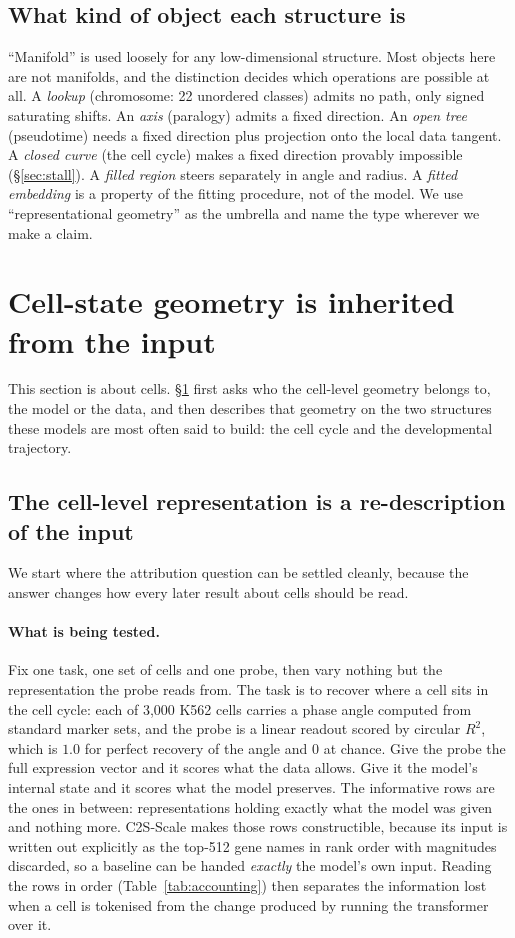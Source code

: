 \documentclass[11pt]{article}
\begin{document}
\subsection{What kind of object each structure is}
``Manifold'' is used loosely for any low-dimensional structure. Most objects here are not manifolds,
and the distinction decides which operations are possible at all. A \emph{lookup}
(chromosome: 22 unordered classes) admits no path, only signed saturating shifts. An \emph{axis}
(paralogy) admits a fixed direction. An \emph{open tree} (pseudotime) needs a fixed direction plus
projection onto the local data tangent. A \emph{closed curve} (the cell cycle) makes a fixed direction
provably impossible (\S\ref{sec:stall}). A \emph{filled region} steers separately in angle and radius.
A \emph{fitted embedding} is a property of the fitting procedure, not of the model. We use
``representational geometry'' as the umbrella and name the type wherever we make a claim.

\section{Cell-state geometry is inherited from the input}\label{sec:inherit}

This section is about cells. \S\ref{sec:inherit} first asks who the cell-level geometry belongs to, the
model or the data, and then describes that geometry on the two structures these models are most often
said to build: the cell cycle and the developmental trajectory.

\subsection{The cell-level representation is a re-description of the input}
We start where the attribution question can be settled cleanly, because the answer changes how every
later result about cells should be read.

\paragraph{What is being tested.} Fix one task, one set of cells and one probe, then vary nothing but
the representation the probe reads from. The task is to recover where a cell sits in the cell cycle:
each of 3{,}000 K562 cells carries a phase angle computed from standard marker sets, and the probe is
a linear readout scored by circular $R^2$, which is $1.0$ for perfect recovery of the angle and $0$ at
chance. Give the probe the full expression vector and it scores what the data allows. Give it the
model's internal state and it scores what the model preserves. The informative rows are the ones in
between: representations holding exactly what the model was given and nothing more. C2S-Scale makes
those rows constructible, because its input is written out explicitly as the top-512 gene names in
rank order with magnitudes discarded, so a baseline can be handed \emph{exactly} the model's own
input. Reading the rows in order (Table~\ref{tab:accounting}) then separates the information lost when
a cell is tokenised from the change produced by running the transformer over it.
\end{document}
